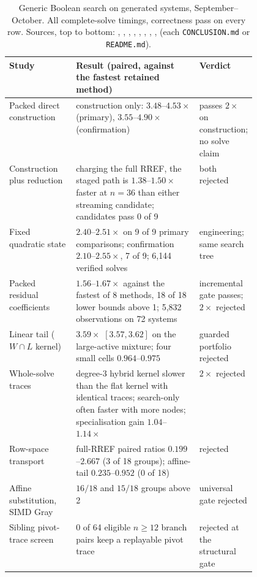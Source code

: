 \begin{table}[t]
\centering\small
\begin{tabularx}{\linewidth}{@{}>{\raggedright}p{0.27\linewidth}>{\raggedright}X>{\raggedright\arraybackslash}p{0.2\linewidth}@{}}
\toprule
Study & Result (paired, against the fastest retained method) & Verdict \\
\midrule
Packed direct construction & construction only: $3.48$--$4.53\times$ (primary), $3.55$--$4.90\times$ (confirmation) & passes $2\times$ on construction; no solve claim \\
Construction plus reduction & charging the full RREF, the staged path is $1.38$--$1.50\times$ faster at $n=36$ than either streaming candidate; candidates pass 0 of 9 & both rejected \\
Fixed quadratic state & $2.40$--$2.51\times$ on 9 of 9 primary comparisons; confirmation $2.10$--$2.55\times$, 7 of 9; 6{,}144 verified solves & engineering; same search tree \\
Packed residual coefficients & $1.56$--$1.67\times$ against the fastest of 8 methods, 18 of 18 lower bounds above 1; 5{,}832 observations on 72 systems & incremental gate passes; $2\times$ rejected \\
Linear tail ($W\cap L$ kernel) & $3.59\times$ $[3.57,3.62]$ on the large-active mixture; four small cells $0.964$--$0.975$ & guarded portfolio rejected \\
Whole-solve traces & degree-3 hybrid kernel slower than the flat kernel with identical traces; search-only often faster with more nodes; specialisation gain $1.04$--$1.14\times$ & $2\times$ rejected \\
Row-space transport & full-RREF paired ratios $0.199$--$2.667$ (3 of 18 groups); affine-tail $0.235$--$0.952$ (0 of 18) & rejected \\
Affine substitution, SIMD Gray & $16/18$ and $15/18$ groups above 2 & universal gate rejected \\
Sibling pivot-trace screen & 0 of 64 eligible $n\ge12$ branch pairs keep a replayable pivot trace & rejected at the structural gate \\
\bottomrule
\end{tabularx}
\caption[]{Generic Boolean search on generated systems, September--October.
All complete-solve timings, correctness pass on every row. Sources, top to
bottom: ,
,
,
,
,
,
,
,
 (each \texttt{CONCLUSION.md}
or \texttt{README.md}).}
\label{tab:bo-generic}
\end{table}

